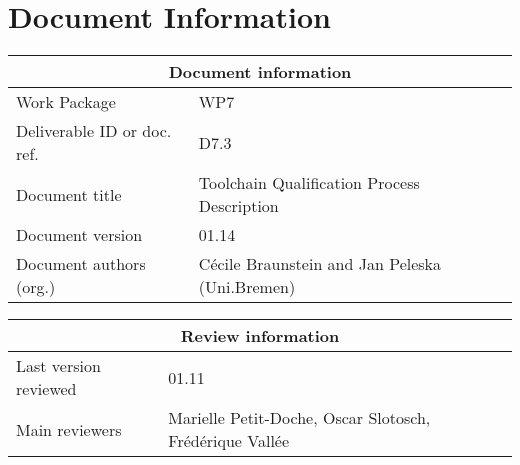 \documentclass{template/openetcs_report}
\begin{document}
\newpage

\chapter{Document Information}

\begin{tabular}{|p{4.4cm}|p{8.7cm}|}
\hline
\multicolumn{2}{|c|}{Document information} \\
\hline
Work Package &  WP7  \\
Deliverable ID or doc. ref. & D7.3\\
\hline
Document title & Toolchain Qualification Process Description \\
Document version & 01.14 \\
Document authors (org.)  & Cécile Braunstein and Jan Peleska (Uni.Bremen) \\
\hline
\end{tabular}

\begin{tabular}{|p{4.4cm}|p{8.7cm}|}
\hline
\multicolumn{2}{|c|}{Review information} \\
\hline
Last version reviewed & 01.11 \\
\hline
Main reviewers &  Marielle Petit-Doche, Oscar Slotosch, Frédérique Vallée\\
\hline
\end{tabular}
\end{document}
